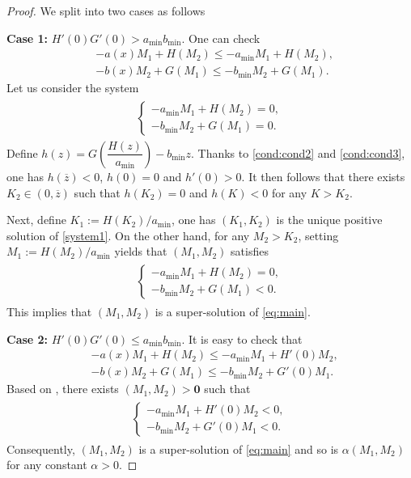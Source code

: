 \documentclass[a4paper,11pt]{amsart}
\theoremstyle{definition}
\numberwithin{equation}{section}
\theoremstyle{definition}
\begin{document}
\begin{proof}
We split into two cases as follows


\textbf{Case 1:} $H'(0)G'(0)>a_{\min} b_{\min}$. One can check
\begin{align*}
&-a(x)M_1+H(M_2)\leq -a_{\min}M_1 + H(M_2),\\
&-b(x)M_2+G(M_1)\leq -b_{\min}M_2 + G	(M_1).
\end{align*}
Let us consider the system
\begin{align}\label{system1}
\begin{split}
\left\{\begin{array}{lllll}
-a_{\min}M_1 + H(M_2)=0,\\
-b_{\min}M_2 + G	(M_1)=0.
\end{array}\right.
\end{split}
\end{align}
Define $h(z)=G\left(\dfrac{H(z)}{{a_{\min}}}\right)-b_{\min} z$. Thanks to 
\ref{cond:cond2} and \ref{cond:cond3}, one has $h(\overline{z})<0$, $h(0)=0$ and $h'(0)>0$. It then follows that there exists $K_2\in (0,\overline{z})$ such that $h(K_2)=0$ and $h(K)<0$ for any $K>K_2$. 

Next, define $K_1 :=H(K_2)/a_{\min}$, one has $(K_1,K_2)$ is the unique positive solution of \eqref{system1}. On the other hand, for any $M_2>K_2$, setting $M_1 := H(M_2)/a_{\min}$ yields that $(M_1,M_2)$ satisfies
\begin{align}\label{system3}
\begin{split}
\left\{\begin{array}{lllll}
-a_{\min}M_1 + H(M_2)=0,\\
-b_{\min}M_2 + G	(M_1)<0.
\end{array}\right.
\end{split}
\end{align}
This implies that $(M_1,M_2)$ is a super-solution of \eqref{eq:main}.


\textbf{Case 2:} $H'(0)G'(0)\leq a_{\min} b_{\min}$. It is easy to check that
\begin{align*}
&-a(x)M_1+H(M_2)\leq -a_{\min}M_1 + H'(0)M_2,\\
&-b(x)M_2+G(M_1)\leq -b_{\min}M_2 + G'	(0)M_1.
\end{align*}
 Based on \cite[Lemma 3.2]{hsu_existence_2013}, there exists $(M_1,M_2)>\textbf{0}$ such that
\begin{align}\label{system2}
\begin{split}
\left\{\begin{array}{lllll}
-a_{\min}M_1 + H'(0)M_2<0,\\
-b_{\min}M_2 + G	'(0)M_1< 0.
\end{array}\right.
\end{split}
\end{align}
Consequently, $(M_1,M_2)$ is a super-solution of \eqref{eq:main} and so is $\alpha(M_1,M_2)$ for any constant $\alpha>0$.
\end{proof}
\end{document}
